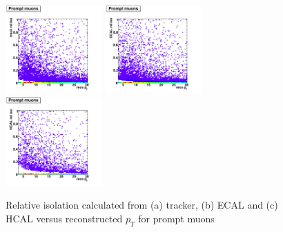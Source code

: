  \begin{figure}[htbp]
    \includegraphics[width = 0.33\textwidth]{pictures/recoPt_relIso/trackIso_muon_prompt.png}
    \includegraphics[width = 0.33\textwidth]{pictures/recoPt_relIso/ecalIso_muon_prompt.png}
    \includegraphics[width = 0.33\textwidth]{pictures/recoPt_relIso/hcalIso_muon_prompt.png}
    \caption{Relative isolation calculated from (a) tracker, (b) ECAL and (c) HCAL versus
       reconstructed $p_{T}$ for prompt muons}
    \label{fig:PromptMuonRecoPt_RelIso}
 \end{figure}

 \clearpage

